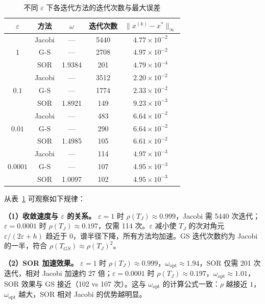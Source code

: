\documentclass[10pt, a4paper]{article}
\begin{document}
\begin{table}[H]
    \centering
    \caption{不同 $\varepsilon$ 下各迭代方法的迭代次数与最大误差}
    \label{tab:results}
    \begin{tabular}{ccccc}
        \toprule
        $\varepsilon$ & 方法 & $\omega$ & 迭代次数 & $\|x^{(k)} - x^*\|_\infty$ \\
        \midrule
        \multirow{3}{*}{$1$}
            & Jacobi  & ---  & 5440 & $4.77\times10^{-2}$ \\
            & G-S     & ---  & 2708 & $4.97\times10^{-2}$ \\
            & SOR     & 1.9384 & 201  & $4.79\times10^{-4}$ \\
        \midrule
        \multirow{3}{*}{$0.1$}
            & Jacobi  & ---  & 3512 & $2.20\times10^{-2}$ \\
            & G-S     & ---  & 1774 & $2.33\times10^{-2}$ \\
            & SOR     & 1.8921 & 149  & $9.23\times10^{-3}$ \\
        \midrule
        \multirow{3}{*}{$0.01$}
            & Jacobi  & ---  & 483  & $6.64\times10^{-2}$ \\
            & G-S     & ---  & 290  & $6.64\times10^{-2}$ \\
            & SOR     & 1.4985 & 105  & $6.61\times10^{-2}$ \\
        \midrule
        \multirow{3}{*}{$0.0001$}
            & Jacobi  & ---  & 114  & $4.97\times10^{-3}$ \\
            & G-S     & ---  & 107  & $4.95\times10^{-3}$ \\
            & SOR     & 1.0097 & 102  & $4.95\times10^{-3}$ \\
        \bottomrule
    \end{tabular}
\end{table}

从表~\ref{tab:results} 可观察如下规律：

\textbf{（1）收敛速度与 $\varepsilon$ 的关系。}
$\varepsilon=1$ 时 $\rho(T_J)\approx0.999$，Jacobi 需 5440 次迭代；$\varepsilon=0.0001$ 时 $\rho(T_J)\approx0.197$，仅需 114 次。$\varepsilon$ 减小使 $T_J$ 的次对角元 $\varepsilon/(2\varepsilon+h)$ 趋近于 $0$，谱半径下降，所有方法均加速。GS 迭代次数约为 Jacobi 的一半，符合 $\rho(T_{GS}) \approx \rho(T_J)^2$。

\textbf{（2）SOR 加速效果。}
$\varepsilon=1$ 时 $\rho(T_J)\approx0.999$，$\omega_{\text{opt}}\approx1.94$，SOR 仅需 201 次迭代，相对 Jacobi 加速约 $27$ 倍；$\varepsilon=0.0001$ 时 $\rho(T_J)\approx0.197$，$\omega_{\text{opt}}\approx1.01$，SOR 效果与 GS 接近（102 vs 107 次）。这与 $\omega_{\text{opt}}$ 的计算公式一致：$\rho$ 越接近 $1$，$\omega_{\text{opt}}$ 越大，SOR 相对 Jacobi 的优势越明显。
\end{document}
